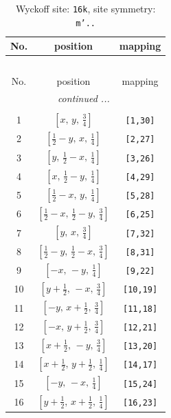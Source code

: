 \documentclass[fleqn,8pt]{jsarticle}
\begin{document}
\renewcommand{\arraystretch}{1.2}
\begin{longtable}{ccc}
\caption{Wyckoff site: {\tt 16k}, site symmetry: {\tt m'..}}
 \\
 \hline \hline
No. & position & mapping \\ \hline \endfirsthead

\multicolumn{2}{l}{\tablename\ \thetable{}} \\
 \hline \hline
No. & position & mapping \\ \hline \endhead

 \hline \hline
\multicolumn{2}{r}{\footnotesize\it continued ...} \\ \endfoot

 \hline \hline
\multicolumn{2}{r}{} \\ \endlastfoot

1 & $\left[ x,\, y,\, \frac{3}{4} \right]$ & {\tt [1,30]} \\ \hline
2 & $\left[ \frac{1}{2} - y,\, x,\, \frac{1}{4} \right]$ & {\tt [2,27]} \\ \hline
3 & $\left[ y,\, \frac{1}{2} - x,\, \frac{1}{4} \right]$ & {\tt [3,26]} \\ \hline
4 & $\left[ x,\, \frac{1}{2} - y,\, \frac{1}{4} \right]$ & {\tt [4,29]} \\ \hline
5 & $\left[ \frac{1}{2} - x,\, y,\, \frac{1}{4} \right]$ & {\tt [5,28]} \\ \hline
6 & $\left[ \frac{1}{2} - x,\, \frac{1}{2} - y,\, \frac{3}{4} \right]$ & {\tt [6,25]} \\ \hline
7 & $\left[ y,\, x,\, \frac{3}{4} \right]$ & {\tt [7,32]} \\ \hline
8 & $\left[ \frac{1}{2} - y,\, \frac{1}{2} - x,\, \frac{3}{4} \right]$ & {\tt [8,31]} \\ \hline
9 & $\left[ - x,\, - y,\, \frac{1}{4} \right]$ & {\tt [9,22]} \\ \hline
10 & $\left[ y + \frac{1}{2},\, - x,\, \frac{3}{4} \right]$ & {\tt [10,19]} \\ \hline
11 & $\left[ - y,\, x + \frac{1}{2},\, \frac{3}{4} \right]$ & {\tt [11,18]} \\ \hline
12 & $\left[ - x,\, y + \frac{1}{2},\, \frac{3}{4} \right]$ & {\tt [12,21]} \\ \hline
13 & $\left[ x + \frac{1}{2},\, - y,\, \frac{3}{4} \right]$ & {\tt [13,20]} \\ \hline
14 & $\left[ x + \frac{1}{2},\, y + \frac{1}{2},\, \frac{1}{4} \right]$ & {\tt [14,17]} \\ \hline
15 & $\left[ - y,\, - x,\, \frac{1}{4} \right]$ & {\tt [15,24]} \\ \hline
16 & $\left[ y + \frac{1}{2},\, x + \frac{1}{2},\, \frac{1}{4} \right]$ & {\tt [16,23]} \\
\end{longtable}
\end{document}
